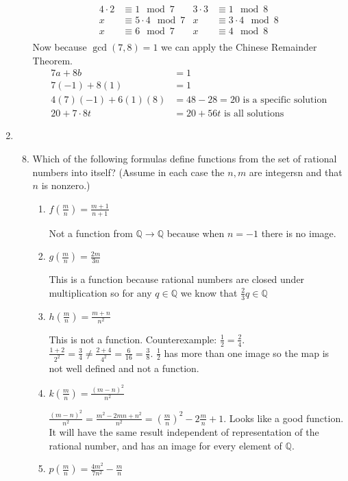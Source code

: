 \documentclass[letterpaper]{article}
\begin{document}
\begin{enumerate}
\begin{enumerate}
\begin{align*}
  4\cdot2&\equiv1\mod 7&3\cdot3&\equiv1\mod8\\
  x&\equiv5\cdot4\mod7&x&\equiv3\cdot4\mod8\\
  x&\equiv6\mod7&x&\equiv4\mod8\\
\end{align*}
Now because $\gcd(7,8)=1$ we can apply the Chinese Remainder Theorem.
\begin{align*}
  7a+8b&=1\\
  7(-1)+8(1)&=1\\
  4(7)(-1)+6(1)(8)&=48-28=20\text{ is a specific solution}\\
  20+7\cdot8t&=20+56t\text{ is all solutions}
\end{align*}
\end{enumerate}
\renewcommand{\labelenumi}{2.\arabic{enumi}}
\setcounter{enumi}{0}
\item
\begin{enumerate}
\setcounter{enumii}{7}
\item
Which of the following formulas define functions from the set of rational numbers into itself? (Assume in each case the $n,m$ are integersn and that $n$ is nonzero.)
\begin{enumerate}
\item
$\displaystyle f\left(\frac{m}{n}\right)=\frac{m+1}{n+1}$

Not a function from $\mathbb{Q}\to\mathbb{Q}$ because when $n=-1$ there is no image.
\item
$\displaystyle g\left(\frac{m}{n}\right)=\frac{2m}{3n}$

This is a function because rational numbers are closed under multiplication so for any $q\in\mathbb{Q}$ we know that $\frac{2}{3}q\in\mathbb{Q}$
\item
$\displaystyle h\left(\frac{m}{n}\right)=\frac{m+n}{n^2}$

This is not a function. Counterexample: $\frac{1}{2}=\frac{2}{4}$. $\frac{1+2}{2^2}=\frac{3}{4}\ne\frac{2+4}{4^2}=\frac{6}{16}=\frac{3}{8}$. $\frac{1}{2}$ has more than one image so the map is not well defined and not a function.
\item
$\displaystyle k\left(\frac{m}{n}\right)=\frac{(m-n)^2}{n^2}$

$\displaystyle \frac{(m-n)^2}{n^2}=\frac{m^2-2mn+n^2}{n^2}=\left(\frac{m}{n}\right)^2-2\frac{m}{n}+1$. Looks like a good function. It will have the same result independent of representation of the rational number, and has an image for every element of $\mathbb{Q}$.
\item
$\displaystyle p\left(\frac{m}{n}\right)=\frac{4m^2}{7n^2}-\frac{m}{n}$


\end{enumerate}
\end{enumerate}
\end{enumerate}
\end{document}
